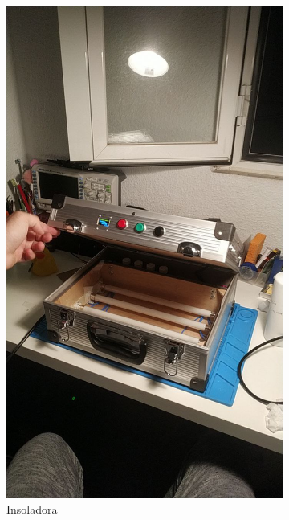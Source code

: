 \begin{figure}[!htb]
    \centering
    \begin{subfigure}[b]{.475\textwidth}
        \centering
        \includegraphics[width=1\textwidth, trim={0 400 0 500}, clip]{tfg/figuras/06_prototipado/insolacion/insoladora.png}
        \caption{Insoladora}
        \label{fig:tfg:06:insoladora}
    \end{subfigure}
    \hfill
    \begin{subfigure}[b]{.475\textwidth}

\end{subfigure}
\end{figure}
